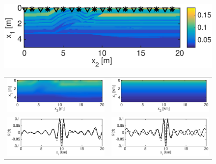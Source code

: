 \documentclass{iopart}
\begin{document}
\begin{figure}
\centering
\includegraphics[scale=.7]{./figs/2D_overthrust1_a}\\
\begin{tabular}{cc}
\includegraphics[scale=.3]{./figs/2D_overthrust1_f}&
\includegraphics[scale=.3]{./figs/2D_overthrust2_f}\\
\includegraphics[scale=.3]{./figs/2D_overthrust1_k}&
\includegraphics[scale=.3]{./figs/2D_overthrust2_k}\\

\end{tabular}
\end{figure}
\end{document}
